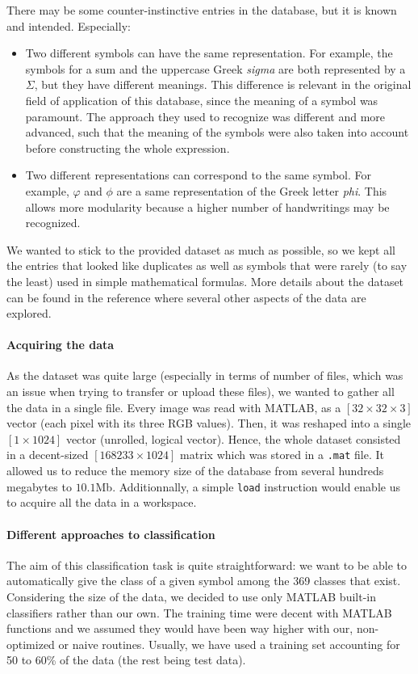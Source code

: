 \documentclass[twocolumn]{article}%
\begin{document}
	There may be some counter-instinctive entries in the database, but it is known and intended. Especially:
	\begin{itemize}
	\item Two different symbols can have the same representation. For example, the symbols for a sum and the uppercase Greek \textit{sigma} are both represented by a $\Sigma$, but they have different meanings. This difference is relevant in the original field of application of this database, since the meaning of a symbol was paramount. The approach they used to recognize was different and more advanced, such that the meaning of the symbols were also taken into account before constructing the whole expression.
	\item Two different representations can correspond to the same symbol. For example,  $\varphi$ and $\phi$ are a same representation of the Greek letter \textit{phi}. This allows more modularity because a higher number of handwritings may be recognized.
	\end{itemize}
	We wanted to stick to the provided dataset as much as possible, so we kept all the entries that looked like duplicates as well as symbols that were rarely (to say the least) used in simple mathematical formulas. More details about the dataset can be found in the reference \cite{hasyv2} where several other aspects of the data are explored.
	
	\paragraph{Acquiring the data}
	As the dataset was quite large (especially in terms of number of files, which was an issue when trying to transfer or upload these files), we wanted to gather all the data in a single file. Every image was read with MATLAB, as a $[32\times32\times 3]$ vector (each pixel with its three RGB values). Then, it was reshaped into a single $[1\times1024]$ vector (unrolled, logical vector). Hence, the whole dataset consisted in a decent-sized $[168233 \times 1024]$ matrix which was stored in a \texttt{.mat} file. It allowed us to reduce the memory size of the database from several hundreds megabytes to $10.1$Mb. Additionnally, a simple \texttt{load} instruction would enable us to acquire all the data in a workspace.
	
	
	\paragraph{Different approaches to classification}
	The aim of this classification task is quite straightforward: we want to be able to automatically give the class of a given symbol among the 369 classes that exist. Considering the size of the data, we decided to use only MATLAB built-in classifiers rather than our own. The training time were decent with MATLAB functions and we assumed they would have been way higher with our, non-optimized or naive routines. Usually, we have used a training set accounting for 50 to 60\% of the data (the rest being test data).
	
\end{document}
